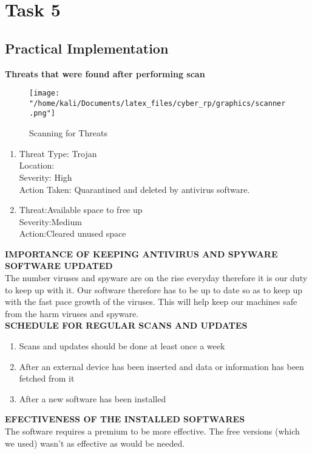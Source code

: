 \chapter*{ \centering Task 5}

\section*{Practical Implementation}

\textbf{Threats that were found after performing scan}\\
	\begin{figure}[H]
	\centering
	\texttt{[image: "/home/kali/Documents/latex\_files/cyber\_rp/graphics/scanner.png"]} \\
	\caption{Scanning for Threats}
\end{figure}
\begin{enumerate}
	\item
	 Threat Type: Trojan\\
	Location: \\
	Severity: High \\
	Action Taken: Quarantined and deleted by antivirus software. \\
	\item
	Threat:Available space to free up\\
	Severity:Medium\\
	Action:Cleared unused space

\end{enumerate}

\newpage
\textbf{IMPORTANCE OF KEEPING ANTIVIRUS AND SPYWARE SOFTWARE UPDATED}\\
The number viruses and spyware are on the rise everyday therefore it is our duty to keep up with it. Our software therefore has to be up to date so as to keep up with the fast pace growth of the viruses. This will help keep our machines safe from the harm viruses and spyware.\\

\textbf{SCHEDULE FOR REGULAR SCANS AND UPDATES}
\begin{enumerate}
	\item	Scans and updates should be done at least once a week
	\item	After an external device has been inserted and data or information has been fetched from it
	\item After a new software has been installed
\end{enumerate}

\textbf{EFECTIVENESS OF THE INSTALLED SOFTWARES}\\
The software requires a premium to be more effective. The free versions (which we used) wasn’t as effective as would be needed.